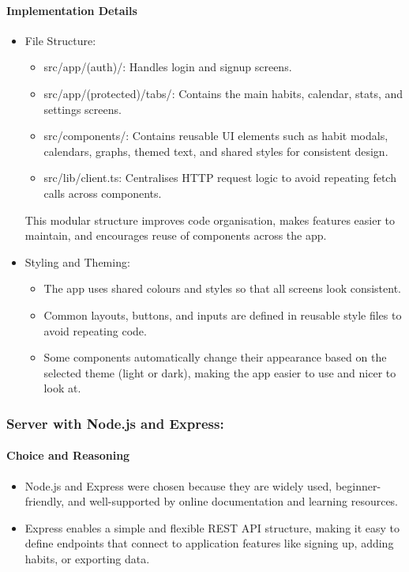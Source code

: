 \paragraph{Implementation Details} \begin{itemize} \item {File Structure}:
\begin{itemize} \item {src/app/(auth)/}: Handles login and signup screens.
\item{src/app/(protected)/tabs/}: Contains the main habits, calendar, stats, and settings screens.
\item{src/components/}: Contains reusable UI elements such as habit modals, calendars, graphs, themed text, and shared styles for consistent design.
\item {src/lib/client.ts}: Centralises HTTP request logic to avoid repeating fetch calls across components. \end{itemize} 
This modular structure improves code organisation, makes features easier to maintain, and encourages reuse of components across the app.
\item {Styling and Theming}:
\begin{itemize} 
\item The app uses shared colours and styles so that all screens look consistent.
\item Common layouts, buttons, and inputs are defined in reusable style files to avoid repeating code.
\item Some components automatically change their appearance based on the selected theme (light or dark), making the app easier to use and nicer to look at. \end{itemize} \end{itemize}


\subsubsection{Server with Node.js and Express:}

\paragraph{Choice and Reasoning}
\begin{itemize}
\item Node.js and Express were chosen because they are widely used, beginner-friendly, and well-supported by online documentation and learning resources.
\item Express enables a simple and flexible REST API structure, making it easy to define endpoints that connect to application features like signing up, adding habits, or exporting data.
\end{itemize}

